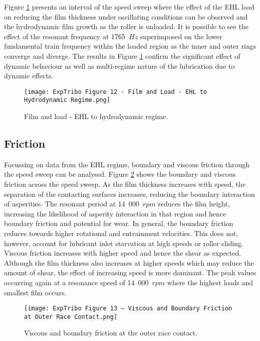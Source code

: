 Figure \ref{Film and load - EHL to hydrodynamic regime} presents an interval of the speed sweep where the effect of the EHL load on reducing the film thickness under oscillating conditions can be observed and the hydrodynamic film growth as the roller is unloaded. It is possible to see the effect of the resonant frequency at 1765~$Hz$ superimposed on the lower fundamental train frequency within the loaded region as the inner and outer rings converge and diverge. The results in Figure \ref{Film and load - EHL to hydrodynamic regime} confirm the significant effect of dynamic behaviour as well as multi-regime nature of the lubrication due to dynamic effects.

\begin{figure}
	\centering
	\texttt{[image: ExpTribo Figure 12 - Film and Load - EHL to Hydrodynamic Regime.png]}
	\caption{Film and load - EHL to hydrodynamic regime.}
	\label{Film and load - EHL to hydrodynamic regime}
\end{figure} 

\subsection{Friction} 
Focussing on data from the EHL regime, boundary and viscous friction through the speed sweep can be analysed. Figure \ref{Viscous and boundary friction at the outer race contact} shows the boundary and viscous friction across the speed sweep. As the film thickness increases with speed, the separation of the contacting surfaces increases, reducing the boundary interaction of asperities. The resonant period at 14~000~$rpm$ reduces the film height, increasing the likelihood of asperity interaction in that region and hence boundary friction and potential for wear. In general, the boundary friction reduces towards higher rotational and entrainment velocities. This does not, however, account for lubricant inlet starvation at high speeds or roller sliding. Viscous friction increases with higher speed and hence the shear as expected. Although the film thickness also increases at higher speeds which may reduce the amount of shear, the effect of increasing speed is more dominant. The peak values occurring again at a resonance speed of 14~000~$rpm$ where the highest loads and smallest film occurs. 

\begin{figure}
	\centering
	\texttt{[image: ExpTribo Figure 13 – Viscous and Boundary Friction at Outer Race Contact.png]}
	\caption{Viscous and boundary friction at the outer race contact.}
	\label{Viscous and boundary friction at the outer race contact}
\end{figure} 

